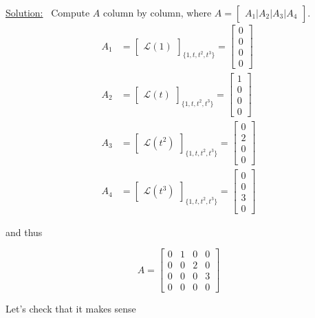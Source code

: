 \documentclass[letterpaper]{article}
\begin{document}
\underline{Solution:}~ Compute $A$ column by column, where $A = \begin{bmatrix} A_1 | A_2 | A_3 | A_4 \end{bmatrix}$.
    \begin{align*}
        A_1 &= \begin{bmatrix}\mathcal{L}(1)\end{bmatrix}_{ \{1, t, t^2, t^3\} } = \begin{bmatrix}0 \\ 0 \\ 0 \\ 0  \end{bmatrix}\\
        A_2 &= \begin{bmatrix}\mathcal{L}(t)\end{bmatrix}_{ \{1, t, t^2, t^3\} } = \begin{bmatrix}1 \\ 0 \\ 0 \\ 0  \end{bmatrix}\\
        A_3 &= \begin{bmatrix}\mathcal{L}(t^2)\end{bmatrix}_{ \{1, t, t^2, t^3\} } = \begin{bmatrix}0 \\ 2 \\ 0 \\ 0  \end{bmatrix}\\
        A_4 &= \begin{bmatrix}\mathcal{L}(t^3)\end{bmatrix}_{ \{1, t, t^2, t^3\} } = \begin{bmatrix}0 \\ 0 \\ 3 \\ 0  \end{bmatrix}
    \end{align*}

    and thus

    $$A = \begin{bmatrix}0 & 1 & 0 & 0 \\ 0 & 0 & 2 & 0 \\ 0 & 0 & 0 & 3 \\ 0 & 0 & 0 & 0  \end{bmatrix} $$

    \newpage

    Let's check that it makes sense
\end{document}
